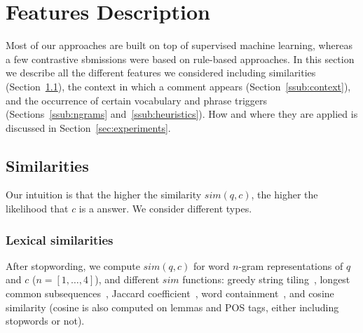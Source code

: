\section{Features Description}
\label{sec:approach}

Most of our approaches are built on top of supervised machine learning, 
whereas a few contrastive sbmissions were based on rule-based approaches. In 
this section we describe all the different features we considered including 
similarities (Section~\ref{sub:sim}), the context in which a comment appears 
(Section~\ref{ssub:context}), and the occurrence of certain vocabulary and 
phrase triggers (Sections~\ref{ssub:ngrams} and~\ref{ssub:heuristics}). How 
and where they are applied is discussed in Section~\ref{sec:experiments}.

% 

\subsection{Similarities}
\label{sub:sim}

Our intuition is that the higher the similarity  $sim(q,c)$, the higher the 
likelihood that $c$ is a \good answer. We consider different types.

\subsubsection{Lexical similarities}

After stopwording, we compute $sim(q, c)$ for word $n$-gram representations of 
$q$ and $c$ ($n=[1,\ldots,4]$), and different $sim$ functions: greedy string 
tiling~\cite{Wise:1996}, longest common subsequences~\cite{Allison:1986}, 
Jaccard coefficient~\cite{Jaccard:1901}, word containment~\cite{Lyon:2001}, and 
cosine similarity (cosine is also computed on lemmas and POS tags, either 
including stopwords or not).

